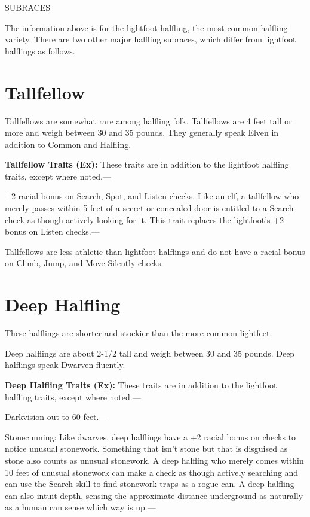 \documentclass{article}
\begin{document}
\vspace{12pt}
SUBRACES

The information above is for the lightfoot halfling, the most common halfling variety. 
There are two other major halfling subraces, which differ from lightfoot halflings 
as follows.

\vspace{12pt}
\section*{\textbf{Tallfellow}}

Tallfellows are somewhat rare among halfling folk. Tallfellows are 4 feet tall 
or more and weigh between 30 and 35 pounds. They generally speak Elven in addition 
to Common and Halfling. 

\textbf{Tallfellow Traits (Ex):} These traits are in addition to the lightfoot 
halfling traits, except where noted.--- 

\parindent=3pt
+2 racial bonus on Search, Spot, and Listen checks. Like an elf, a tallfellow who 
merely passes within 5 feet of a secret or concealed door is entitled to a Search 
check as though actively looking for it. This trait replaces the lightfoot's +2 
bonus on Listen checks.---

\parindent=0pt
Tallfellows are less athletic than lightfoot halflings and do not have a racial 
bonus on Climb, Jump, and Move Silently checks.

\vspace{12pt}
\section*{\textbf{Deep Halfling}}

These halflings are shorter and stockier than the more common lightfeet.

Deep halflings are about 2-1/2 tall and weigh between 30 and 35 pounds. Deep halflings 
speak Dwarven fluently.

\textbf{Deep Halfling Traits (Ex):} These traits are in addition to the lightfoot 
halfling traits, except where noted.---

Darkvision out to 60 feet.---

Stonecunning: Like dwarves, deep halflings have a +2 racial bonus on checks to 
notice unusual stonework. Something that isn't stone but that is disguised as stone 
also counts as unusual stonework. A deep halfling who merely comes within 10 feet 
of unusual stonework can make a check as though actively searching and can use 
the Search skill to find stonework traps as a rogue can. A deep halfling can also 
intuit depth, sensing the approximate distance underground as naturally as a human 
can sense which way is up.--- 
\end{document}
